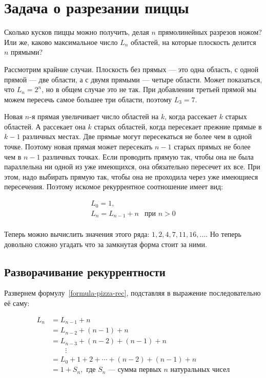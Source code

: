 \section{Задача о разрезании пиццы}

Сколько кусков пиццы можно получить, делая $n$ прямолинейных разрезов ножом?
Или же, каково максимальное число $L_n$ областей, на которые плоскость делится
$n$ прямыми?

Рассмотрим крайние случаи. Плоскость без прямых --- это одна область, 
с одной прямой --- две области, а с двумя прямыми --- четыре области.
Может показаться, что $L_n = 2^n$, но в общем случае это не так.
При добавлении третьей прямой мы можем пересечь самое большее три области,
поэтому $L_3 = 7$.

Новая $n$-я прямая увеличивает число областей на $k$, когда рассекает $k$ старых
областей. А рассекает она $k$ старых областей, когда пересекает прежние прямые
в $k-1$ различных местах. Две прямые могут пересекаться не более чем в одной точке.
Поэтому новая прямая может пересекать $n-1$ старых прямых не более чем в $n-1$
различных точках. Если проводить прямую так, чтобы она не была параллельна ни одной
из уже имеющихся, она обязательно пересечет их все. При этом, надо выбирать прямую так,
чтобы она не проходила через уже имеющиеся пересечения. Поэтому искомое рекуррентное
соотношение имеет вид:

\begin{equation}
\label{formula-pizza-rec}
\begin{array}{ll}
L_0 = 1, \\
L_n = L_{n-1} + n & \text{при } n > 0 \\
\end{array}
\end{equation}

Теперь можно вычислить значения этого ряда: $1, 2, 4, 7, 11, 16, \ldots$. 
Но теперь довольно сложно угадать что за замкнутая форма стоит за ними.

\subsection{Разворачивание рекуррентности}

Развернем формулу~\ref{formula-pizza-rec}, подставляя в выражение последовательно её саму:

\begin{align*}
L_n &= L_{n-1} + n \\
    &= L_{n-2} + (n-1) + n \\
    &= L_{n-3} + (n-2) + (n-1) + n \\
    & \qquad\vdots \\
    &= L_0 + 1 + 2 + \cdots + (n-2) + (n-1) + n \\
    &= 1 + S_n, \text{ где $S_n$ --- сумма первых $n$ натуральных чисел}
\end{align*}

